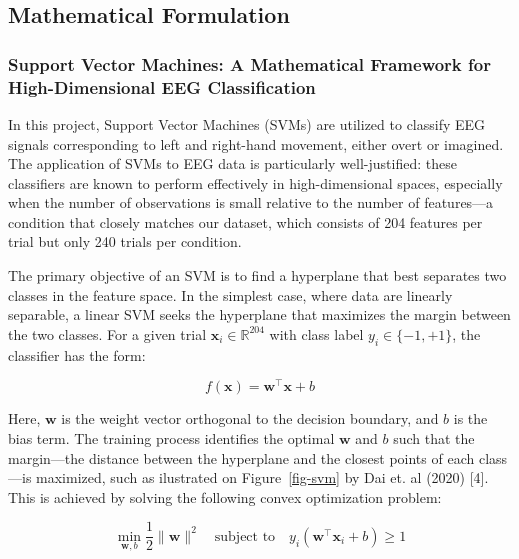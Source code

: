 \documentclass[
  letterpaper,
  DIV=11,
  numbers=noendperiod]{scrartcl}
\begin{document}
\subsection{Mathematical Formulation}\label{mathematical-formulation}

\subsubsection{Support Vector Machines: A Mathematical Framework for
High-Dimensional EEG
Classification}\label{support-vector-machines-a-mathematical-framework-for-high-dimensional-eeg-classification}

In this project, Support Vector Machines (SVMs) are utilized to classify
EEG signals corresponding to left and right-hand movement, either overt
or imagined. The application of SVMs to EEG data is particularly
well-justified: these classifiers are known to perform effectively in
high-dimensional spaces, especially when the number of observations is
small relative to the number of features---a condition that closely
matches our dataset, which consists of 204 features per trial but only
240 trials per condition.

The primary objective of an SVM is to find a hyperplane that best
separates two classes in the feature space. In the simplest case, where
data are linearly separable, a linear SVM seeks the hyperplane that
maximizes the margin between the two classes. For a given trial
\(\mathbf{x}_i \in \mathbb{R}^{204}\) with class label
\(y_i \in \{-1, +1\}\), the classifier has the form:

\[
f(\mathbf{x}) = \mathbf{w}^\top \mathbf{x} + b
\]

Here, \(\mathbf{w}\) is the weight vector orthogonal to the decision
boundary, and \(b\) is the bias term. The training process identifies
the optimal \(\mathbf{w}\) and \(b\) such that the margin---the distance
between the hyperplane and the closest points of each class---is
maximized, such as ilustrated on Figure~\ref{fig-svm} by Dai et. al
(2020) {[}4{]}. This is achieved by solving the following convex
optimization problem:

\[
\min_{\mathbf{w}, b} \frac{1}{2} \|\mathbf{w}\|^2
\quad \text{subject to} \quad
y_i (\mathbf{w}^\top \mathbf{x}_i + b) \geq 1
\]
\end{document}
